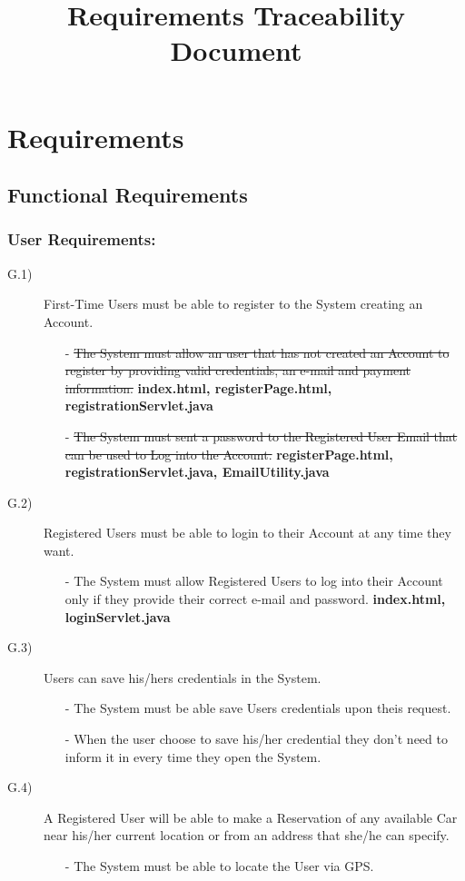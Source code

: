 \documentclass[a4paper]{article}
\title{Requirements Traceability Document}
\begin{document}
\section{Requirements}
\subsection{Functional Requirements}
\subsubsection{\textbf{User Requirements:}}
\begin{description}
\item [G.1)]First-Time Users must be able to register to the System creating an Account. 
\begin{itemize}
	\item[-]\sout{The System must allow an user that has not created an Account to register by providing valid credentials, an e-mail and payment information.}
	\textbf{index.html, registerPage.html, registrationServlet.java}
	\item[-]\sout{The System must sent a password to the Registered User Email that can be used to Log into the Account.}
	\textbf{registerPage.html, registrationServlet.java, EmailUtility.java}
\end{itemize}
\item [G.2)]Registered Users must be able to login to their Account at any time they want.
\begin{itemize}
	\item[-]The System must allow Registered Users to log into their Account only if they provide their correct e-mail and password.
	\textbf{index.html, loginServlet.java}
\end{itemize}
\item [G.3)]Users can save his/hers credentials in the System.
\begin{itemize}
	\item[-]The System must be able save Users credentials upon theis request.
	\item[-]When the user choose to save his/her credential they don't need to inform it in every time they open the System.
\end{itemize}
\item [G.4)]A Registered User will be able to make a Reservation of any available Car near his/her current location or from an address that she/he can specify.
\begin{itemize}
	\item[-]The System must be able to locate the User via GPS.

\end{itemize}
\end{description}
\end{document}
